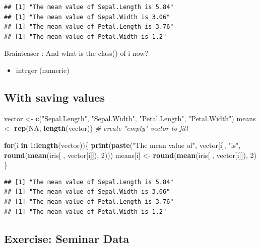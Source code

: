 \documentclass[
]{book}
\newenvironment{Shaded}{\begin{snugshade}}{\end{snugshade}}
\newcommand{\CommentTok}[1]{\textcolor[rgb]{0.56,0.35,0.01}{\textit{#1}}}
\newcommand{\ConstantTok}[1]{\textcolor[rgb]{0.56,0.35,0.01}{#1}}
\newcommand{\ControlFlowTok}[1]{\textcolor[rgb]{0.13,0.29,0.53}{\textbf{#1}}}
\newcommand{\DecValTok}[1]{\textcolor[rgb]{0.00,0.00,0.81}{#1}}
\newcommand{\FunctionTok}[1]{\textcolor[rgb]{0.13,0.29,0.53}{\textbf{#1}}}
\newcommand{\NormalTok}[1]{#1}
\newcommand{\OtherTok}[1]{\textcolor[rgb]{0.56,0.35,0.01}{#1}}
\newcommand{\SpecialCharTok}[1]{\textcolor[rgb]{0.81,0.36,0.00}{\textbf{#1}}}
\newcommand{\StringTok}[1]{\textcolor[rgb]{0.31,0.60,0.02}{#1}}
\providecommand{\tightlist}{%
  \setlength{\itemsep}{0pt}\setlength{\parskip}{0pt}}
\begin{document}
\begin{verbatim}
## [1] "The mean value of Sepal.Length is 5.84"
## [1] "The mean value of Sepal.Width is 3.06"
## [1] "The mean value of Petal.Length is 3.76"
## [1] "The mean value of Petal.Width is 1.2"
\end{verbatim}

Brainteaser : And what is the class() of i now?

\begin{itemize}
\tightlist
\item
  integer (numeric)
\end{itemize}

\subsection{With saving values}\label{with-saving-values}

\begin{Shaded}
\begin{Highlighting}[]
\NormalTok{vector }\OtherTok{\textless{}{-}} \FunctionTok{c}\NormalTok{(}\StringTok{"Sepal.Length"}\NormalTok{, }\StringTok{"Sepal.Width"}\NormalTok{, }\StringTok{"Petal.Length"}\NormalTok{, }\StringTok{"Petal.Width"}\NormalTok{)}
\NormalTok{means }\OtherTok{\textless{}{-}} \FunctionTok{rep}\NormalTok{(}\ConstantTok{NA}\NormalTok{, }\FunctionTok{length}\NormalTok{(vector)) }\CommentTok{\# create "empty" vector to fill}

\ControlFlowTok{for}\NormalTok{(i }\ControlFlowTok{in} \DecValTok{1}\SpecialCharTok{:}\FunctionTok{length}\NormalTok{(vector))\{}
  \FunctionTok{print}\NormalTok{(}\FunctionTok{paste}\NormalTok{(}\StringTok{"The mean value of"}\NormalTok{, vector[i], }\StringTok{"is"}\NormalTok{, }
              \FunctionTok{round}\NormalTok{(}\FunctionTok{mean}\NormalTok{(iris[ , vector[i]]), }\DecValTok{2}\NormalTok{)))}
\NormalTok{  means[i] }\OtherTok{\textless{}{-}} \FunctionTok{round}\NormalTok{(}\FunctionTok{mean}\NormalTok{(iris[ , vector[i]]), }\DecValTok{2}\NormalTok{)}
\NormalTok{\}}
\end{Highlighting}
\end{Shaded}

\begin{verbatim}
## [1] "The mean value of Sepal.Length is 5.84"
## [1] "The mean value of Sepal.Width is 3.06"
## [1] "The mean value of Petal.Length is 3.76"
## [1] "The mean value of Petal.Width is 1.2"
\end{verbatim}

\subsection{Exercise: Seminar Data}\label{exercise-seminar-data}
\end{document}
